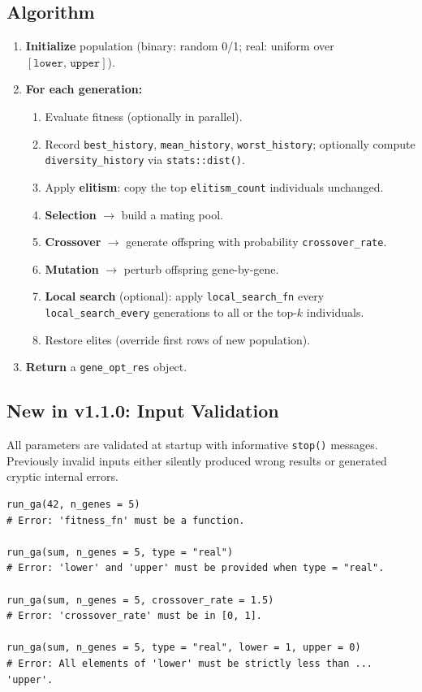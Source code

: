 \documentclass[11pt,a4paper]{article}
\begin{document}
\subsection{Algorithm}

\begin{enumerate}[leftmargin=*, label=\arabic*.]
  \item \textbf{Initialize} population (binary: random 0/1; real: uniform
    over $[\texttt{lower},\,\texttt{upper}]$).
  \item \textbf{For each generation:}
    \begin{enumerate}[label=\alph*.]
      \item Evaluate fitness (optionally in parallel).
      \item Record \texttt{best\_history}, \texttt{mean\_history},
        \texttt{worst\_history}; optionally compute
        \texttt{diversity\_history} via \texttt{stats::dist()}.
      \item Apply \textbf{elitism}: copy the top \texttt{elitism\_count}
        individuals unchanged.
      \item \textbf{Selection} $\to$ build a mating pool.
      \item \textbf{Crossover} $\to$ generate offspring with probability
        \texttt{crossover\_rate}.
      \item \textbf{Mutation} $\to$ perturb offspring gene-by-gene.
      \item \textbf{Local search} (optional): apply
        \texttt{local\_search\_fn} every \texttt{local\_search\_every}
        generations to all or the top-$k$ individuals.
      \item Restore elites (override first rows of new population).
    \end{enumerate}
  \item \textbf{Return} a \texttt{gene\_opt\_res} object.
\end{enumerate}

\subsection{New in v1.1.0: Input Validation}

All parameters are validated at startup with informative \texttt{stop()}
messages. Previously invalid inputs either silently produced wrong results or
generated cryptic internal errors.

\begin{lstlisting}
run_ga(42, n_genes = 5)
# Error: 'fitness_fn' must be a function.

run_ga(sum, n_genes = 5, type = "real")
# Error: 'lower' and 'upper' must be provided when type = "real".

run_ga(sum, n_genes = 5, crossover_rate = 1.5)
# Error: 'crossover_rate' must be in [0, 1].

run_ga(sum, n_genes = 5, type = "real", lower = 1, upper = 0)
# Error: All elements of 'lower' must be strictly less than ... 'upper'.
\end{lstlisting}
\end{document}
